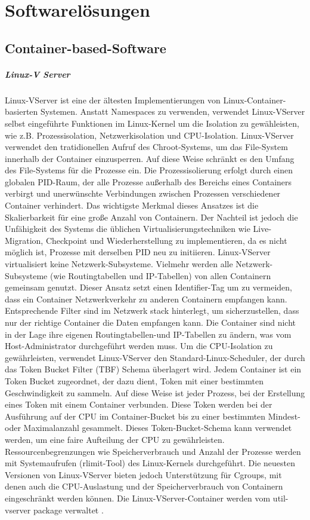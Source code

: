 \thispagestyle{empty}

\section{Softwarelösungen}

\subsection{Container-based-Software}

\subparagraph{Linux-V Server}
Linux-VServer ist eine der ältesten Implementierungen von Linux-Container-basierten Systemen. Anstatt Namespaces zu verwenden, verwendet Linux-VServer selbst eingeführte Funktionen im Linux-Kernel um die Isolation zu gewähleisten, wie z.B. Prozessisolation, Netzwerkisolation und CPU-Isolation. Linux-VServer verwendet den tratidionellen Aufruf des Chroot-Systems, um das File-System innerhalb der Container einzusperren. Auf diese Weise schränkt es den Umfang des File-Systems für die Prozesse ein. Die Prozessisolierung erfolgt durch einen globalen PID-Raum, der alle Prozesse außerhalb des Bereichs eines Containers verbirgt und unerwünschte Verbindungen zwischen Prozessen verschiedener Container verhindert. Das wichtigste Merkmal dieses Ansatzes ist die Skalierbarkeit für eine große Anzahl von Containern. Der Nachteil ist jedoch die Unfähigkeit des Systems die üblichen Virtualisierungstechniken wie Live-Migration, Checkpoint und Wiederherstellung zu implementieren, da es nicht möglich ist, Prozesse mit derselben PID neu zu initiieren. Linux-VServer virtualisiert keine Netzwerk-Subsysteme. Vielmehr werden alle Netzwerk-Subsysteme (wie Routingtabellen und IP-Tabellen) von allen Containern gemeinsam genutzt. Dieser Ansatz setzt einen Identifier-Tag um zu vermeiden, dass ein Container Netzwerkverkehr zu anderen Containern empfangen kann. Entsprechende Filter sind im Netzwerk stack hinterlegt, um sicherzustellen, dass nur der richtige Container die Daten empfangen kann. Die Container sind nicht in der Lage ihre eigenen Routingtabellen-und IP-Tabellen zu ändern, was vom Host-Administrator durchgeführt werden muss. Um die CPU-Isolation zu gewährleisten, verwendet Linux-VServer den Standard-Linux-Scheduler, der durch das Token Bucket Filter (TBF) Schema überlagert wird. Jedem Container ist ein Token Bucket zugeordnet, der dazu dient, Token mit einer bestimmten Geschwindigkeit zu sammeln. Auf diese Weise ist jeder Prozess, bei der Erstellung eines Token mit einem Container verbunden. Diese Token werden bei der Ausführung auf der CPU im Container-Bucket bis zu einer bestimmten Mindest- oder Maximalanzahl gesammelt. Dieses Token-Bucket-Schema kann verwendet werden, um eine faire Aufteilung der CPU zu gewährleisten. Ressourcenbegrenzungen wie Speicherverbrauch und Anzahl der Prozesse werden mit Systemaufrufen (rlimit-Tool) des Linux-Kernels durchgeführt. Die neuesten Versionen von Linux-VServer bieten jedoch Unterstützung für Cgroups, mit denen auch die CPU-Auslastung und der Speicherverbrauch von Containern eingeschränkt werden können. Die Linux-VServer-Container werden vom util-vserver\cite{Optionen2018Userspace-WerkzeugeLinux-VServer} package verwaltet \cite{Overview2018PaperLinux-VServer} \cite{Xavier2015AClouds}.

